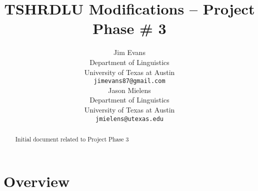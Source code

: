 \documentclass[11pt]{article}
\title{TSHRDLU Modifications -- Project Phase \# 3}
\author{Jim Evans \\
  Department of Linguistics \\
  University of Texas at Austin \\
  {\tt jimevans87@gmail.com} \\\And
  Jason Mielens \\
  Department of Linguistics \\
  University of Texas at Austin \\
  {\tt jmielens@utexas.edu} \\}
\date{}
\begin{document}
\maketitle
\begin{abstract}
  Initial document related to Project Phase 3 
\end{abstract}

\section{Overview}
\end{document}

